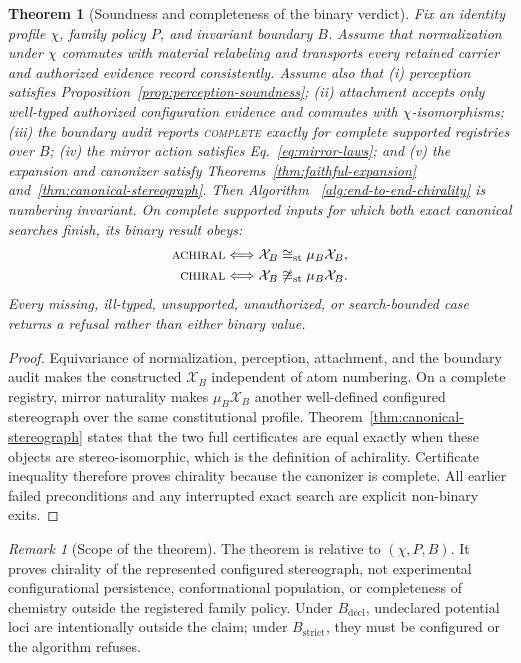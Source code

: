 \documentclass[pdflatex,sn-mathphys-num,referee,lineno]{sn-jnl}
\theoremstyle{plain}
\newtheorem{theorem}{Theorem}
\theoremstyle{remark}
\newtheorem{remark}{Remark}
\theoremstyle{definition}
\begin{document}
\begin{theorem}[Soundness and completeness of the binary verdict]
\label{thm:chirality-pipeline}
Fix an identity profile \(\chi\), family policy \(P\), and invariant boundary
\(B\).  Assume that normalization under \(\chi\) commutes with material
relabeling and transports every retained carrier and authorized evidence record
consistently. Assume also that (i) perception satisfies
Proposition~\ref{prop:perception-soundness}; (ii) attachment accepts only
well-typed authorized configuration evidence and commutes with
\(\chi\)-isomorphisms; (iii) the boundary audit reports \textsc{complete}
exactly for complete supported registries over \(B\); (iv) the mirror action
satisfies Eq.~\eqref{eq:mirror-laws}; and (v) the expansion and canonizer
satisfy Theorems~\ref{thm:faithful-expansion}
and~\ref{thm:canonical-stereograph}.  Then Algorithm~
\ref{alg:end-to-end-chirality} is numbering invariant. On complete supported
inputs for which both exact canonical searches finish, its binary result obeys:
\begin{align*}
  \textsc{achiral}
  &\Longleftrightarrow
  \mathcal X_B\cong_{\mathrm{st}}\mu_B\mathcal X_B,\\
  \textsc{chiral}
  &\Longleftrightarrow
  \mathcal X_B\not\cong_{\mathrm{st}}\mu_B\mathcal X_B .
\end{align*}
Every missing, ill-typed, unsupported, unauthorized, or search-bounded case
returns a refusal rather than either binary value.
\end{theorem}

\begin{proof}
Equivariance of normalization, perception, attachment, and the boundary audit
makes the constructed \(\mathcal X_B\) independent of atom numbering.
On a complete registry, mirror naturality makes \(\mu_B\mathcal X_B\) another
well-defined configured stereograph over the same constitutional profile.
Theorem~\ref{thm:canonical-stereograph} states that the two full certificates
are equal exactly when these objects are stereo-isomorphic, which is the
definition of achirality.  Certificate inequality therefore proves chirality
because the canonizer is complete.  All earlier failed preconditions and any
interrupted exact search are explicit non-binary exits.
\end{proof}

\begin{remark}[Scope of the theorem]
The theorem is relative to \((\chi,P,B)\).  It proves chirality of the
represented configured stereograph, not experimental configurational
persistence, conformational population, or completeness of chemistry outside
the registered family policy.  Under \(B_{\mathrm{decl}}\), undeclared
potential loci are intentionally outside the claim; under
\(B_{\mathrm{strict}}\), they must be configured or the algorithm refuses.
\end{remark}
\end{document}
